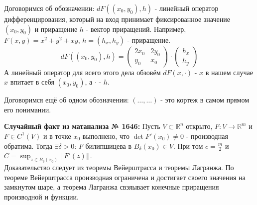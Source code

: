 \documentclass[book, 11pt]{report}
\begin{document}
\vspace{0.5cm}
\par{Договоримся об обозначении: $dF((x_0,y_0),h)$ - линейный оператор дифференцирования, который на вход принимает фиксированное значение $(x_0,y_0)$ и приращение $h$ - вектор приращений. Например, $F(x,y)=x^2+y^2+xy$, $h=(h_x,h_y)$ - приращение. 
\begin{equation*}
    dF((x_0,y_0),h)=\begin{pmatrix} 
        2x_0 & 2y_0 \\
        y_0 & x_0
    \end{pmatrix} \cdot \begin{pmatrix} h_x\\h_y \end{pmatrix}
\end{equation*}
А линейный оператор для всего этого дела обзовём $dF(x,\cdot)$ - $x$ в нашем случае $x$ впитает в себя $(x_0,y_0)$, а $\cdot$ - $h$.
}
\vspace{0.5cm}
\par{Договоримся ещё об одном обозначении: $(\ldots,\ldots)$ - это кортеж в самом прямом его понимании.}
\vspace{0.8cm}
\par{\textbf{Случайный факт из матанализа № 1646: } Пусть $V\subset\mathbb{R}^n$ открыто, $F:V\to\mathbb{R}^m$ и $F\in C^1(V)$ и в точке $x_0$ выполнено, что $\det F'(x_0)\ne 0$ - производная обратима. Тогда $\exists\delta>0$: $F$ билипшицева в $B_\delta(x_0)\in V$. При том $c=\frac{m}{2}$ и $C=\sup_{z\in B_\delta(x_0)}||F'(z)||$.\\
Доказательство следует из теоремы Вейерштрасса и теоремы Лагранжа. По теореме Вейерштрасса производная ограничена и достигает своего значения на замкнутом шаре, а теорема Лагранжа свзяывает конечные приращения производной и функции.
}
\vspace{0.5cm}
\par
\noindent\hrulefill\noindent
\par{\ }
\end{document}
